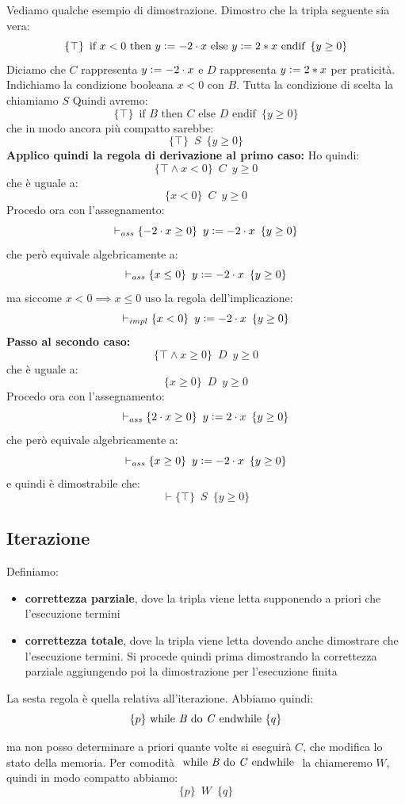 \begin{esempio}
	Vediamo qualche esempio di dimostrazione. Dimostro che la tripla seguente sia
	vera:
	\[\{\top\}\,\,\,\mbox{if } x<0 \mbox{ then }y\cceq -2\cdot x \mbox{ else }
		y\cceq 2*x\mbox{ endif}\,\,\,\{y\geq 0\}\]
		Diciamo che $C$ rappresenta $y\cceq -2\cdot x$ e $D$ rappresenta $y\cceq 2*x$
		per praticità. Indichiamo la condizione booleana $x<0$ con $B$. Tutta la
		condizione di scelta la chiamiamo $S$
		Quindi avremo:
		\[\{\top\}\,\,\,\mbox{if } B \mbox{ then }C\mbox{ else }
			D \mbox{ endif}\,\,\,\{y\geq 0\}\]
			che in modo ancora più compatto sarebbe:
			\[\{\top\}\,\,\,S\,\,\,\{y\geq 0\}\]
			\textbf{Applico quindi la regola di derivazione al primo caso:}
			Ho quindi:
			\[\{\top \land x<0\}\,\,\,C\,\,\,{y\geq 0}\]
			che è uguale a:
			\[\{x<0\}\,\,\,C\,\,\,{y\geq 0}\]
			Procedo ora con l'assegnamento:
			\[\vdash_{ass}\{-2\cdot x\geq 0\}\,\,\,y\cceq -2\cdot x\,\,\,\{y\geq 0\}\]
			che però equivale algebricamente a:
			\[\vdash_{ass}\{x\leq 0\}\,\,\,y\cceq -2\cdot x\,\,\,\{y\geq 0\}\]
			ma siccome $x<0 \implies x\leq 0$ uso la regola dell'implicazione:
			\[\vdash_{impl}\{x< 0\}\,\,\,y\cceq -2\cdot x\,\,\,\{y\geq 0\}\]
			\textbf{Passo al secondo caso:}
			\[\{\top \land x\geq 0\}\,\,\,D\,\,\,{y\geq 0}\]
			che è uguale a:
			\[\{x\geq 0\}\,\,\,D\,\,\,{y\geq 0}\]
			Procedo ora con l'assegnamento:
			\[\vdash_{ass}\{2\cdot x\geq 0\}\,\,\,y\cceq 2\cdot x\,\,\,\{y\geq 0\}\]
			che però equivale algebricamente a:
			\[\vdash_{ass}\{x\geq 0\}\,\,\,y\cceq -2\cdot x\,\,\,\{y\geq 0\}\]
			e quindi è dimostrabile che:
			\[\vdash \{\top\}\,\,\,S\,\,\,\{y\geq 0\}\]
			\end{esempio}
			\subsection{Iterazione}
			\begin{definizione}
				Definiamo:
				\begin{itemize}
					\item \textbf{correttezza parziale}, dove la tripla viene letta supponendo a
					      priori che l'esecuzione termini
					\item \textbf{correttezza totale}, dove la tripla viene letta dovendo anche
					      dimostrare che l'esecuzione termini. Si procede quindi prima dimostrando la
					      correttezza parziale aggiungendo poi la dimostrazione per l'esecuzione
					      finita
				\end{itemize}
			\end{definizione}
			\begin{definizione}
				La sesta regola è quella relativa all'iterazione. Abbiamo quindi:
				\[\{p\}\mbox{ while \textit{B} do \textit{C} endwhile }\{q\}\]
			\end{definizione}
			ma non posso determinare a priori quante volte si eseguirà $C$, che modifica
			lo stato della memoria. Per comodità $\mbox{ while \textit{B} do \textit{C}
			endwhile }$ la chiameremo $W$, quindi in modo compatto abbiamo:
			\[\{p\}\,\,\,W\,\,\,\{q\}\]

